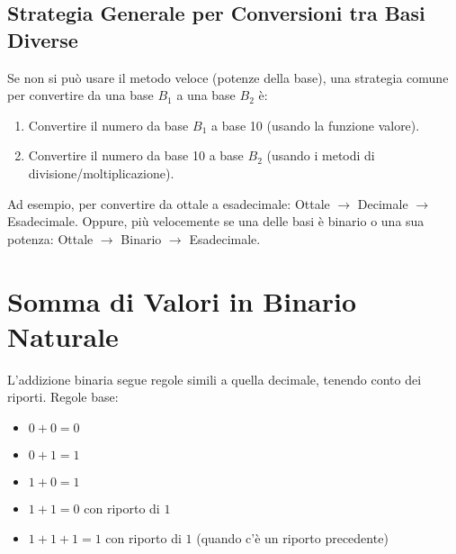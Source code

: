 \subsection{Strategia Generale per Conversioni tra Basi Diverse}
Se non si può usare il metodo veloce (potenze della base), una strategia comune per convertire da una base $B_1$ a una base $B_2$ è:
\begin{enumerate}
    \item Convertire il numero da base $B_1$ a base 10 (usando la funzione valore).
    \item Convertire il numero da base 10 a base $B_2$ (usando i metodi di divisione/moltiplicazione).
\end{enumerate}
Ad esempio, per convertire da ottale a esadecimale: Ottale $\rightarrow$ Decimale $\rightarrow$ Esadecimale.
Oppure, più velocemente se una delle basi è binario o una sua potenza: Ottale $\rightarrow$ Binario $\rightarrow$ Esadecimale.

\section{Somma di Valori in Binario Naturale}
L'addizione binaria segue regole simili a quella decimale, tenendo conto dei riporti.
Regole base:
\begin{itemize}
    \item $0 + 0 = 0$
    \item $0 + 1 = 1$
    \item $1 + 0 = 1$
    \item $1 + 1 = 0$ con riporto di $1$
    \item $1 + 1 + 1 = 1$ con riporto di $1$ (quando c'è un riporto precedente)
\end{itemize}

